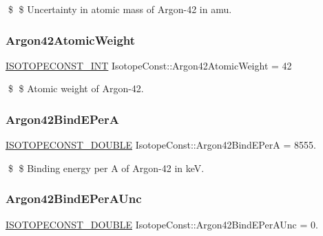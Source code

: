 \$ \$ Uncertainty in atomic mass of Argon-\/42 in amu. \mbox{\label{group___isotope_const-_argon-_ar42_gab7e28bc0aa5275e2d3e039194626bc94}} 
\subsubsection{\texorpdfstring{Argon42\+Atomic\+Weight}{Argon42AtomicWeight}}
{\footnotesize\ttfamily \mbox{\hyperlink{group___isotope_const-_macros_ga5f18360b3e99483a35c32d789e62621c}{I\+S\+O\+T\+O\+P\+E\+C\+O\+N\+S\+T\+\_\+\+I\+NT}} Isotope\+Const\+::\+Argon42\+Atomic\+Weight = 42}

\$ \$ Atomic weight of Argon-\/42. \mbox{\label{group___isotope_const-_argon-_ar42_ga0a27a6a59fea7d6dc63afbd15db0f8d8}} 
\subsubsection{\texorpdfstring{Argon42\+Bind\+E\+PerA}{Argon42BindEPerA}}
{\footnotesize\ttfamily \mbox{\hyperlink{group___isotope_const-_macros_ga8f45a7272ce02c0b4c65c44636ed719a}{I\+S\+O\+T\+O\+P\+E\+C\+O\+N\+S\+T\+\_\+\+D\+O\+U\+B\+LE}} Isotope\+Const\+::\+Argon42\+Bind\+E\+PerA = 8555.}

\$ \$ Binding energy per A of Argon-\/42 in keV. \mbox{\label{group___isotope_const-_argon-_ar42_ga1b0d79fefa5c907b2c237f11b27991dc}} 
\subsubsection{\texorpdfstring{Argon42\+Bind\+E\+Per\+A\+Unc}{Argon42BindEPerAUnc}}
{\footnotesize\ttfamily \mbox{\hyperlink{group___isotope_const-_macros_ga8f45a7272ce02c0b4c65c44636ed719a}{I\+S\+O\+T\+O\+P\+E\+C\+O\+N\+S\+T\+\_\+\+D\+O\+U\+B\+LE}} Isotope\+Const\+::\+Argon42\+Bind\+E\+Per\+A\+Unc = 0.}


